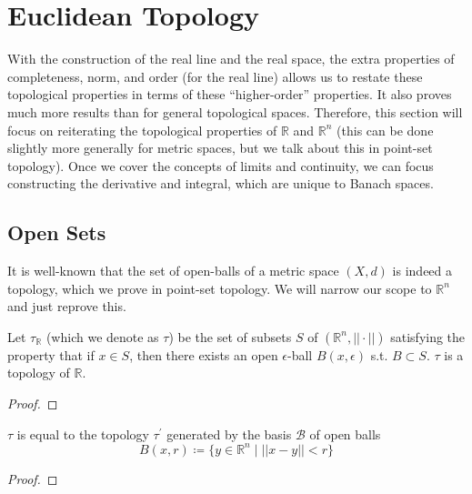 \documentclass{article}
\begin{document}
\section{Euclidean Topology} 

    With the construction of the real line and the real space, the extra properties of completeness, norm, and order (for the real line) allows us to restate these topological properties in terms of these ``higher-order'' properties. It also proves much more results than for general topological spaces. Therefore, this section will focus on reiterating the topological properties of $\mathbb{R}$ and $\mathbb{R}^n$ (this can be done slightly more generally for metric spaces, but we talk about this in point-set topology). Once we cover the concepts of limits and continuity, we can focus constructing the derivative and integral, which are unique to Banach spaces. 

  \subsection{Open Sets} 

    It is well-known that the set of open-balls of a metric space $(X, d)$ is indeed a topology, which we prove in point-set topology. We will narrow our scope to $\mathbb{R}^n$ and just reprove this.  

    \begin{theorem}
      Let $\tau_{\mathbb{R}}$ (which we denote as $\tau$) be the set of subsets $S$ of $(\mathbb{R}^n, || \cdot ||)$ satisfying the property that if $x \in S$, then there exists an open $\epsilon$-ball $B(x, \epsilon)$ s.t. $B \subset S$. $\tau$ is a topology of $\mathbb{R}$. 
    \end{theorem} 
    \begin{proof}
      
    \end{proof}

    \begin{theorem}
      $\tau$ is equal to the topology $\tau^\prime$ generated by the basis $\mathscr{B}$ of open balls 
      \begin{equation} 
        B(x, r) \coloneqq \{ y \in \mathbb{R}^n \mid ||x - y|| < r\}
      \end{equation}
    \end{theorem} 
    \begin{proof}
      
    \end{proof} 
\end{document}
